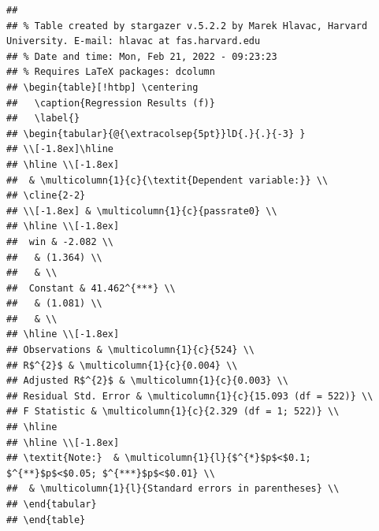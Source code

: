 \documentclass[
  12pt,
  landscape]{article}
\begin{document}
\begin{verbatim}
## 
## % Table created by stargazer v.5.2.2 by Marek Hlavac, Harvard University. E-mail: hlavac at fas.harvard.edu
## % Date and time: Mon, Feb 21, 2022 - 09:23:23
## % Requires LaTeX packages: dcolumn 
## \begin{table}[!htbp] \centering 
##   \caption{Regression Results (f)} 
##   \label{} 
## \begin{tabular}{@{\extracolsep{5pt}}lD{.}{.}{-3} } 
## \\[-1.8ex]\hline 
## \hline \\[-1.8ex] 
##  & \multicolumn{1}{c}{\textit{Dependent variable:}} \\ 
## \cline{2-2} 
## \\[-1.8ex] & \multicolumn{1}{c}{passrate0} \\ 
## \hline \\[-1.8ex] 
##  win & -2.082 \\ 
##   & (1.364) \\ 
##   & \\ 
##  Constant & 41.462^{***} \\ 
##   & (1.081) \\ 
##   & \\ 
## \hline \\[-1.8ex] 
## Observations & \multicolumn{1}{c}{524} \\ 
## R$^{2}$ & \multicolumn{1}{c}{0.004} \\ 
## Adjusted R$^{2}$ & \multicolumn{1}{c}{0.003} \\ 
## Residual Std. Error & \multicolumn{1}{c}{15.093 (df = 522)} \\ 
## F Statistic & \multicolumn{1}{c}{2.329 (df = 1; 522)} \\ 
## \hline 
## \hline \\[-1.8ex] 
## \textit{Note:}  & \multicolumn{1}{l}{$^{*}$p$<$0.1; $^{**}$p$<$0.05; $^{***}$p$<$0.01} \\ 
##  & \multicolumn{1}{l}{Standard errors in parentheses} \\ 
## \end{tabular} 
## \end{table}
\end{verbatim}
\end{document}
